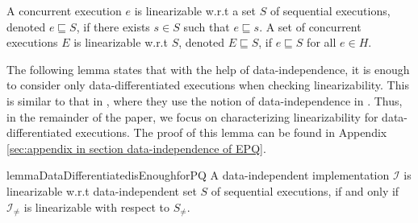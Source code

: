 A concurrent execution $e$ is linearizable w.r.t a set $S$ of sequential executions, denoted $e \sqsubseteq S$, if there exists $s \in S$ such that $e \sqsubseteq s$. A set of concurrent executions $E$ is linearizable w.r.t $S$, denoted $E \sqsubseteq S$, if $e \sqsubseteq S$ for all $e \in H$.

The following lemma states that with the help of data-independence, it is enough to consider only data-differentiated executions when checking linearizability. This is similar to that in \cite{Abdulla:2013}, where they use the notion of data-independence in \cite{Wolper:1986}. Thus, in the remainder of the paper, we focus on characterizing linearizability for data-differentiated executions. The proof of this lemma can be found in Appendix \ref{sec:appendix in section data-independence of EPQ}.

\begin{restatable}{lemma}{DataDifferentiatedisEnoughforPQ}
\label{lemma:data differentiated is enough for PQ}
A data-independent implementation $\mathcal{I}$ is linearizable w.r.t data-independent set $S$ of sequential executions, if and only if $\mathcal{I}_{\neq}$ is linearizable with respect to $S_{\neq}$.
\end{restatable}


